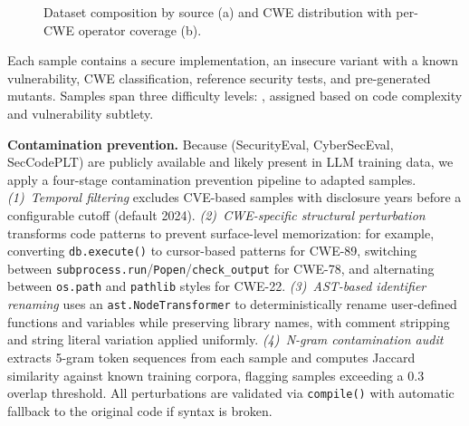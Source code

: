 \documentclass[sigconf,anonymous,review]{acmart}
\begin{document}
\begin{figure}[t]
  \centering
  \caption{Dataset composition by source (a) and CWE distribution with per-CWE operator coverage (b).}
  \label{fig:dataset}
\end{figure}

Each sample contains a secure implementation, an insecure variant with a known vulnerability, CWE classification, reference security tests, and pre-generated mutants. Samples span three difficulty levels: , assigned based on code complexity and vulnerability subtlety.

\textbf{Contamination prevention.} Because  (SecurityEval, CyberSecEval, SecCodePLT) are publicly available and likely present in LLM training data, we apply a four-stage contamination prevention pipeline to adapted samples. \emph{(1)~Temporal filtering} excludes CVE-based samples with disclosure years before a configurable cutoff (default 2024). \emph{(2)~CWE-specific structural perturbation} transforms code patterns to prevent surface-level memorization: for example, converting \texttt{db.execute()} to cursor-based patterns for CWE-89, switching between \texttt{subprocess.run}/\texttt{Popen}/\texttt{check\_output} for CWE-78, and alternating between \texttt{os.path} and \texttt{pathlib} styles for CWE-22. \emph{(3)~AST-based identifier renaming} uses an \texttt{ast.NodeTransformer} to deterministically rename user-defined functions and variables while preserving library names, with comment stripping and string literal variation applied uniformly. \emph{(4)~N-gram contamination audit} extracts 5-gram token sequences from each sample and computes Jaccard similarity against known training corpora, flagging samples exceeding a 0.3 overlap threshold.  All perturbations are validated via \texttt{compile()} with automatic fallback to the original code if syntax is broken.
\end{document}
